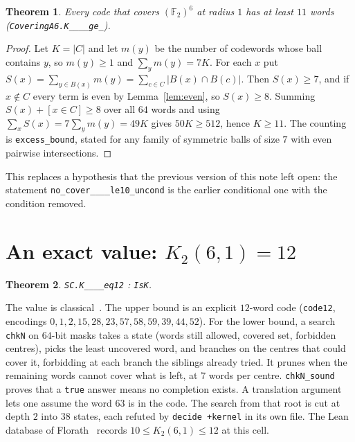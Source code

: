 \documentclass[11pt]{amsart}
\newtheorem{theorem}{Theorem}
\theoremstyle{definition}
\theoremstyle{remark}
\begin{document}
\begin{theorem}\label{thm:ge11}
Every code that covers $(\mathbb{F}_2)^6$ at radius $1$ has at least $11$ words (\texttt{CoveringA6.\allowbreak K\_\_\_\_\allowbreak ge\_}).
\end{theorem}
\begin{proof}
Let $K=|C|$ and let $m(y)$ be the number of codewords whose ball contains $y$, so $m(y)\ge 1$ and $\sum_y m(y)=7K$.
For each $x$ put $S(x)=\sum_{y\in B(x)} m(y)=\sum_{c\in C}|B(x)\cap B(c)|$.
Then $S(x)\ge 7$, and if $x\notin C$ every term is even by Lemma~\ref{lem:even}, so $S(x)\ge 8$.
Summing $S(x)+[x\in C]\ge 8$ over all $64$ words and using $\sum_x S(x)=7\sum_y m(y)=49K$ gives $50K\ge 512$, hence $K\ge 11$.
The counting is \texttt{excess\_\allowbreak bound}, stated for any family of symmetric balls of size $7$ with even pairwise intersections.
\end{proof}

This replaces a hypothesis that the previous version of this note left open: the statement \texttt{no\_\allowbreak cover\_\_\_\_\allowbreak le10\_\allowbreak uncond} is the earlier conditional one with the condition removed.

\section{An exact value: $K_2(6,1)=12$}

\begin{theorem}\label{thm:eq12}
\texttt{SC.\allowbreak K\_\_\_\_\allowbreak eq12} : \texttt{IsK}.
\end{theorem}

The value is classical~\cite{sk1968}.
The upper bound is an explicit $12$-word code (\texttt{code12}, encodings $0,1,2,15,28,23,57,58,59,39,44,52$).
For the lower bound, a search \texttt{chkN} on $64$-bit masks takes a state (words still allowed, covered set, forbidden centres), picks the least uncovered word, and branches on the centres that could cover it, forbidding at each branch the siblings already tried.
It prunes when the remaining words cannot cover what is left, at $7$ words per centre.
\texttt{chkN\_\allowbreak sound} proves that a \texttt{true} answer means no completion exists.
A translation argument lets one assume the word $63$ is in the code.
The search from that root is cut at depth $2$ into $38$ states, each refuted by \texttt{decide +kernel} in its own file.
The Lean database of Florath~\cite{florath2026} records $10\le K_2(6,1)\le 12$ at this cell.
\end{document}
